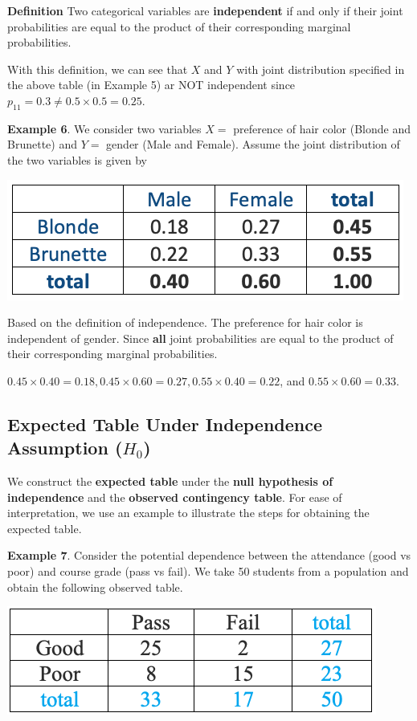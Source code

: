 \documentclass[
]{book}
\begin{document}
\textbf{Definition} Two categorical variables are \textbf{independent} if and only if their joint probabilities are equal to the product of their corresponding marginal probabilities.

With this definition, we can see that \(X\) and \(Y\) with joint distribution specified in the above table (in Example 5) ar NOT independent since \(p_{11} =0.3 \ne 0.5\times 0.5 = 0.25\).

\textbf{Example 6}. We consider two variables \(X =\) preference of hair color (Blonde and Brunette) and \(Y =\) gender (Male and Female). Assume the joint distribution of the two variables is given by

\begin{center}\includegraphics[width=0.35\linewidth]{week13/independenceContingencyTable} \end{center}

Based on the definition of independence. The preference for hair color is independent of gender. Since \textbf{all} joint probabilities are equal to the product of their corresponding marginal probabilities.

\(0.45\times 0.40 = 0.18, 0.45 \times 0.60 = 0.27, 0.55 \times 0.40 = 0.22\), and \(0.55 \times 0.60 = 0.33.\)

\hypertarget{expected-table-under-independence-assumption-h_0}{%
\subsection{\texorpdfstring{Expected Table Under Independence Assumption (\textbf{\(H_0\)})}{Expected Table Under Independence Assumption (H\_0)}}\label{expected-table-under-independence-assumption-h_0}}

We construct the \textbf{expected table} under the \textbf{null hypothesis of independence} and the \textbf{observed contingency table}. For ease of interpretation, we use an example to illustrate the steps for obtaining the expected table.

\textbf{Example 7}. Consider the potential dependence between the attendance (good vs poor) and course grade (pass vs fail). We take 50 students from a population and obtain the following observed table.

\begin{center}\includegraphics[width=0.35\linewidth]{week13/attendancePassFail} \end{center}
\end{document}
